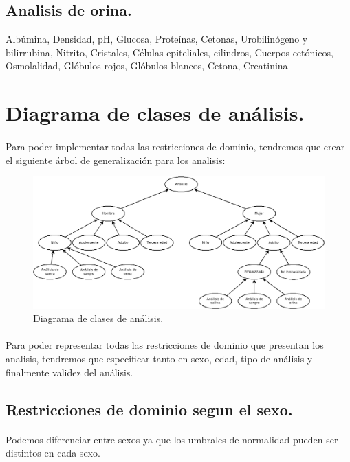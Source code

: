 \documentclass[a4paper,10pt]{article}
\begin{document}
\subsection{Analisis de orina.}
Albúmina, Densidad, pH, Glucosa, Proteínas, Cetonas, Urobilinógeno y bilirrubina, Nitrito, Cristales, Células epiteliales, cilindros, Cuerpos cetónicos, Osmolalidad, Glóbulos rojos, Glóbulos blancos, Cetona, Creatinina
\pagebreak

\section{Diagrama de clases de análisis.}
\paragraph{}
Para poder implementar todas las restricciones de dominio, tendremos que crear el siguiente árbol de generalización para los analisis:\\
\begin{figure}[hbt]
	\includegraphics[width=\textwidth]{img/analisis.png}
	\caption{Diagrama de clases de análisis.}
	\label{fig:diagramaanalisis}
\end{figure}
\paragraph{}
Para poder representar todas las restricciones de dominio que presentan los analisis, tendremos que especificar tanto en sexo, edad, tipo de análisis y finalmente validez del análisis.
\subsection{Restricciones de dominio segun el sexo.}
\paragraph{}
Podemos diferenciar entre sexos ya que los umbrales de normalidad pueden ser distintos en cada sexo.
\end{document}
